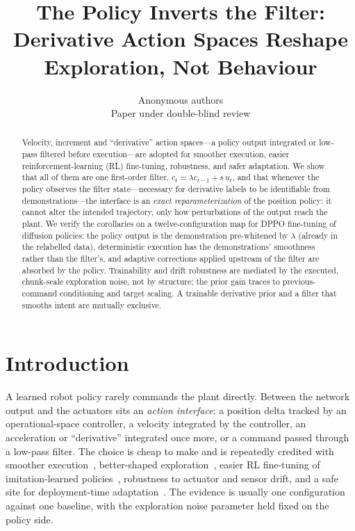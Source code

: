 \documentclass{article}
\title{The Policy Inverts the Filter:\\ Derivative Action Spaces Reshape\\ Exploration, Not Behaviour}
\author{Anonymous authors\\ Paper under double-blind review}
\begin{document}
\maketitle

\begin{abstract}
Velocity, increment and ``derivative'' action spaces---a policy output integrated or low-pass filtered before execution---are adopted for smoother execution, easier reinforcement-learning (RL) fine-tuning, robustness, and safer adaptation. We show that all of them are one first-order filter, $c_t=\lambda c_{t-1}+s\,u_t$, and that whenever the policy observes the filter state---necessary for derivative labels to be identifiable from demonstrations---the interface is an \emph{exact reparameterization} of the position policy: it cannot alter the intended trajectory, only how perturbations of the output reach the plant. We verify the corollaries on a twelve-configuration map for DPPO fine-tuning of diffusion policies: the policy output is the demonstration pre-whitened by $\lambda$ (already in the relabelled data), deterministic execution has the demonstrations' smoothness rather than the filter's, and adaptive corrections applied upstream of the filter are absorbed by the policy. Trainability and drift robustness are mediated by the executed, chunk-scale exploration noise, not by structure; the prior gain traces to previous-command conditioning and target scaling. A trainable derivative prior and a filter that smooths intent are mutually exclusive.
\end{abstract}

\section{Introduction}

A learned robot policy rarely commands the plant directly. Between the network output and the actuators sits an \emph{action interface}: a position delta tracked by an operational-space controller, a velocity integrated by the controller, an acceleration or ``derivative'' integrated once more, or a command passed through a low-pass filter. The choice is cheap to make and is repeatedly credited with smoother execution~\citep{mysore2021caps,raffin2021smoothexplorationroboticreinforcement}, better-shaped exploration~\citep{eberhard2023pink,korenkevych2019autoregressive}, easier RL fine-tuning of imitation-learned policies~\citep{ren2024diffusionpolicypolicyoptimization,li2026reinforcementlearningactionchunking}, robustness to actuator and sensor drift, and a safe site for deployment-time adaptation~\citep{muttaqien2026orpaonlineresidualpolicy,wagenmaker2025steeringdiffusionpolicylatent}. The evidence is usually one configuration against one baseline, with the exploration noise parameter held fixed on the policy side.
\end{document}

